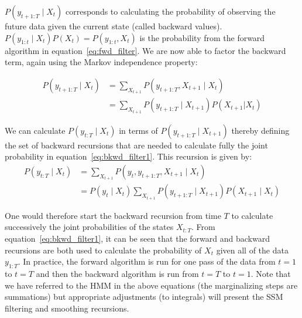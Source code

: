 $P(y_{t+1:T} \mid X_t)$ corresponds to calculating the probability of observing the future data given the current state (called backward values). $P(y_{1:t} \mid X_t)P(X_t) = P(y_{1:t}, X_t)$ is the probability from the forward algorithm in equation~\ref{eq:fwd_filter}. We are now able to factor the backward term, again using the Markov independence property:

\begin{equation}\label{eq:bkwd_filter2}
  \begin{split}
    P(y_{t+1:T} \mid X_t) &= \sum_{X_{t+1}} P(y_{t+1:T}, X_{t+1} \mid X_t) \\&= \sum_{X_{t+1}} P(y_{t+1:T} \mid X_{t+1})P(X_{t+1} | X_{t})
  \end{split}
\end{equation}

We can calculate $P(y_{t:T} \mid X_{t})$ in terms of $P(y_{t+1:T} \mid X_{t+1})$ thereby defining the set of backward recursions that are needed to calculate fully the joint probability in equation~\ref{eq:bkwd_filter1}. This recursion is given by:
\begin{equation}\label{eq:bkwd_filter3}
  \begin{split}
    P(y_{t:T} \mid X_t) &= \sum_{X_{t+1}} P(y_t, y_{t+1:T}, X_{t+1} \mid X_t) \\&= P(y_t \mid X_t) \sum_{X_{t+1}} P( y_{t+1:T} \mid X_{t+1} ) P( X_{t+1} \mid X_t )
  \end{split}
\end{equation}

One would therefore start the backward recursion from time $T$ to calculate successively the joint probabilities of the states $X_{t:T}$. From equation~\ref{eq:bkwd_filter1}, it can be seen that the forward and backward recursions are both used to calculate the probability of $X_{t}$ given all of the data $y_{1:T}$. In practice, the forward algorithm is run for one pass of the data from $t=1$ to $t=T$ and then the backward algorithm is run from $t=T$ to $t=1$. Note that we have referred to the HMM in the above equations (the marginalizing steps are summations) but appropriate adjustments (to integrals) will present the SSM filtering and smoothing recursions.

